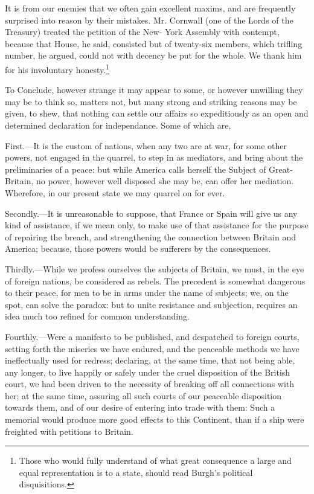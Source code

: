 \documentclass[12pt,oneside]{memoir}
\begin{document}
It is from our enemies that we often gain excellent maxims, and are
frequently surprised into reason by their mistakes. Mr. Cornwall
(one of the Lords of the Treasury) treated the petition of the New-
York Assembly with contempt, because that House, he said, consisted
but of twenty-six members, which trifling number, he argued, could
not with decency be put for the whole. We thank him for his
involuntary honesty.\footnote{Those who would fully understand of what great consequence a large and equal representation is to a state, should read Burgh's political disquisitions.}

To Conclude, however strange it may appear to some, or however
unwilling they may be to think so, matters not, but many strong and
striking reasons may be given, to shew, that nothing can settle our
affairs so expeditiously as an open and determined declaration for
independance. Some of which are,

First.---It is the custom of nations, when any two are at war, for
some other powers, not engaged in the quarrel, to step in as
mediators, and bring about the preliminaries of a peace: but while
America calls herself the Subject of Great-Britain, no power,
however well disposed she may be, can offer her mediation. Wherefore,
in our present state we may quarrel on for ever.

Secondly.---It is unreasonable to suppose, that France or Spain will
give us any kind of assistance, if we mean only, to make use of that
assistance for the purpose of repairing the breach, and
strengthening the connection between Britain and America; because,
those powers would be sufferers by the consequences.

Thirdly.---While we profess ourselves the subjects of Britain, we
must, in the eye of foreign nations, be considered as rebels. The
precedent is somewhat dangerous to their peace, for men to be in
arms under the name of subjects; we, on the spot, can solve the
paradox: but to unite resistance and subjection, requires an idea
much too refined for common understanding.

Fourthly.---Were a manifesto to be published, and despatched to
foreign courts, setting forth the miseries we have endured, and the
peaceable methods we have ineffectually used for redress; declaring,
at the same time, that not being able, any longer, to live happily
or safely under the cruel disposition of the British court, we had
been driven to the necessity of breaking off all connections with
her; at the same time, assuring all such courts of our peaceable
disposition towards them, and of our desire of entering into trade
with them: Such a memorial would produce more good effects to this
Continent, than if a ship were freighted with petitions to Britain.
\end{document}
